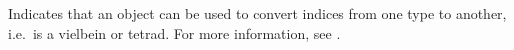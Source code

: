 
Indicates that an object can be used to convert indices from one type
to another, i.e.~is a vielbein or tetrad. For more information, see
.

